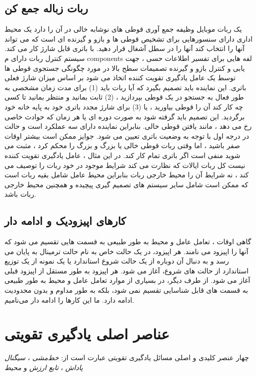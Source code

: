 \subsection{ربات زباله جمع کن}
یک ربات موبایل وظیفه جمع آوری قوطی های نوشابه خالی در آن را دارد
یک محیط اداری دارای سنسورهایی برای تشخیص قوطی ها و بازو و گیرنده ای است که می تواند آنها را انتخاب کند
آنها را در سطل آشغال قرار دهید. با باتری قابل شارژ کار می کند. سیستم کنترل ربات
دارای م components لفه هایی برای تفسیر اطلاعات حسی ، جهت یابی و کنترل بازو و
گیرنده تصمیمات سطح بالا در مورد چگونگی جستجوی قوطی ها توسط یک عامل یادگیری تقویت کننده اتخاذ می شود
بر اساس میزان شارژ فعلی باتری. این نماینده باید تصمیم بگیرد که آیا ربات باید (1)
برای مدت زمان مشخصی به طور فعال به جستجو در یک قوطی بپردازید ، (2) ثابت بمانید و منتظر بمانید تا کسی چه کار کند
آن را قوطی بیاورید ، یا (3) برای شارژ مجدد باتری خود به پایه خانه خود برگردید. این تصمیم باید گرفته شود
به صورت دوره ای یا هر زمان که حوادث خاصی رخ می دهد ، مانند یافتن قوطی خالی. بنابراین نماینده
دارای سه عملکرد است و حالت در درجه اول با توجه به وضعیت باتری تعیین می شود. جوایز ممکن است
بیشتر اوقات صفر باشید ، اما وقتی ربات قوطی خالی یا بزرگ و بزرگ را محکم کرد ، مثبت می شوید
منفی است اگر باتری تمام کار کند. در این مثال ، عامل یادگیری تقویت کننده نیست
کل ربات ایالات که نظارت می کند شرایط موجود در خود ربات را توصیف می کند ، نه شرایط آن را
محیط خارجی ربات بنابراین محیط عامل شامل بقیه ربات است که
ممکن است شامل سایر سیستم های تصمیم گیری پیچیده و همچنین محیط خارجی ربات باشد.



\subsection{کارهای اپیزودیک و ادامه دار}
گاهی اوقات ، تعامل عامل و محیط به طور طبیعی به قسمت هایی تقسیم می شود که آنها را اپیزود می نامند. هر اپیزود، در یک حالت خاص به نام حالت ترمینال به پایان می رسد و به دنبال آن دوباره از یک حالت شروع استاندارد یا یک نمونه از یک توزیع استاندارد از حالت های شروع، آغاز می شود. هر اپیزود به طور مستقل از اپیزود قبلی آغاز می شود.
از طرف دیگر، در بسیاری از موارد تعامل عامل و محیط به طور طبیعی به قسمت های قابل شناسایی تقسیم نمی شود، بلکه به طور مداوم و بدون محدودیت ادامه دارد. ما این کارها را ادامه دار می‌نامیم.


\section{عناصر اصلی یادگیری تقویتی}
چهار عنصر کلیدی و اصلی مسائل یادگیری تقویتی عبارت است از:
\textit{خط‌مشی} ، 
\textit{سیگنال پاداش} ،
\textit{تابع ارزش}  
و
\textit{محیط} 
